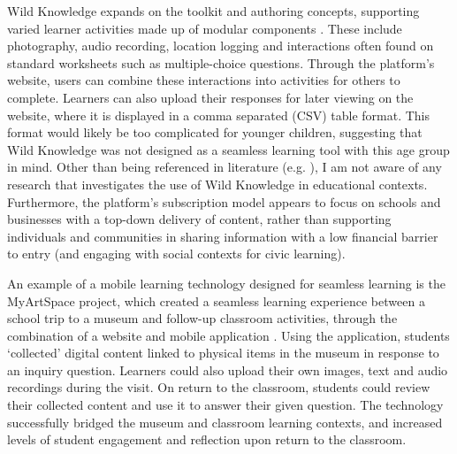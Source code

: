 Wild Knowledge expands on the toolkit and authoring concepts, supporting varied learner activities made up of modular components \citep{WildKnowledge2015}. These include photography, audio recording, location logging and interactions often found on standard worksheets such as multiple-choice questions. Through the platform’s website, users can combine these interactions into activities for others to complete. Learners can also upload their responses for later viewing on the website, where it is displayed in a comma separated (CSV) table format. This format would likely be too complicated for younger children, suggesting that Wild Knowledge was not designed as a seamless learning tool with this age group in mind. Other than being referenced in literature (e.g. \citep{Traxler2013}), I am not aware of any research that investigates the use of Wild Knowledge in educational contexts. Furthermore, the platform’s subscription model appears to focus on schools and businesses with a top-down delivery of content, rather than supporting individuals and communities in sharing information with a low financial barrier to entry (and engaging with social contexts for civic learning).

An example of a mobile learning technology designed for seamless learning is the MyArtSpace project, which created a seamless learning experience between a school trip to a museum and follow-up classroom activities, through the combination of a website and mobile application \citep{Vavoula2009}. Using the application, students `collected’ digital content linked to physical items in the museum in response to an inquiry question. Learners could also upload their own images, text and audio recordings during the visit. On return to the classroom, students could review their collected content and use it to answer their given question. The technology successfully bridged the museum and classroom learning contexts, and increased levels of student engagement and reflection upon return to the classroom. 

